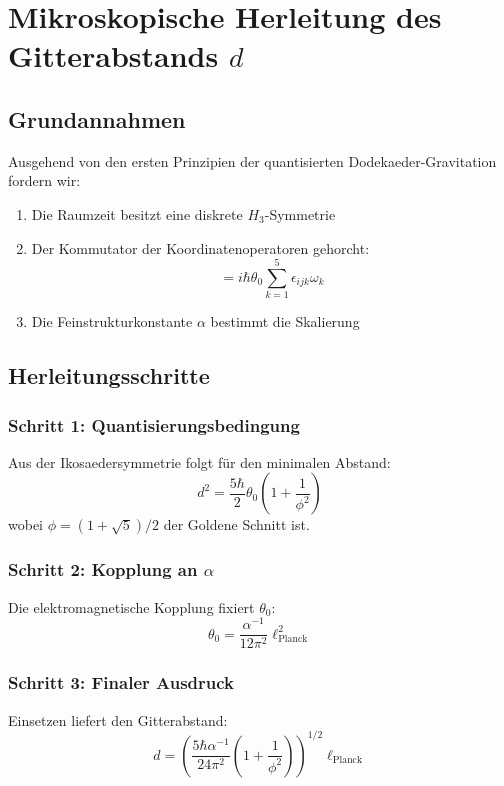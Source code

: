 \newpage
\section{Mikroskopische Herleitung des Gitterabstands $d$}
\label{sec:gitterabstand}

\subsection{Grundannahmen}

Ausgehend von den ersten Prinzipien der quantisierten Dodekaeder-Gravitation fordern wir:

\begin{enumerate}
\item Die Raumzeit besitzt eine diskrete $H_3$-Symmetrie
\item Der Kommutator der Koordinatenoperatoren gehorcht:
\begin{equation}
[X_i,X_j] = i\hbar\theta_0\sum_{k=1}^5\epsilon_{ijk}\omega_k
\end{equation}
\item Die Feinstrukturkonstante $\alpha$ bestimmt die Skalierung
\end{enumerate}

\subsection{Herleitungsschritte}

\subsubsection{Schritt 1: Quantisierungsbedingung}
Aus der Ikosaedersymmetrie folgt für den minimalen Abstand:
\begin{equation}
d^2 = \frac{5\hbar}{2}\theta_0\left(1 + \frac{1}{\phi^2}\right)
\end{equation}
wobei $\phi = (1+\sqrt{5})/2$ der Goldene Schnitt ist.

\subsubsection{Schritt 2: Kopplung an $\alpha$}
Die elektromagnetische Kopplung fixiert $\theta_0$:
\begin{equation}
\theta_0 = \frac{\alpha^{-1}}{12\pi^2}\ell_{\text{Planck}}^2
\end{equation}

\subsubsection{Schritt 3: Finaler Ausdruck}
Einsetzen liefert den Gitterabstand:
\begin{equation}
d = \left(\frac{5\hbar\alpha^{-1}}{24\pi^2}\left(1+\frac{1}{\phi^2}\right)\right)^{1/2}\ell_{\text{Planck}}
\end{equation}

